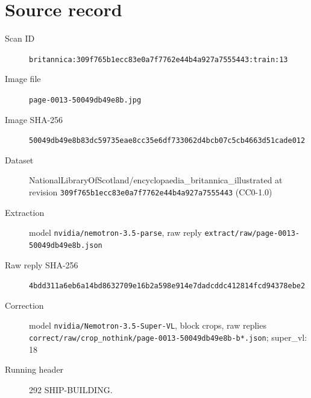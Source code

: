 \documentclass{article}
\begin{document}
\section*{Source record}
\begin{description}
\item[Scan ID] \texttt{britannica:309f765b1ecc83e0a7f7762e44b4a927a7555443:train:13}
\item[Image file] \texttt{page-0013-50049db49e8b.jpg}
\item[Image SHA-256] \texttt{50049db49e8b83dc59735eae8cc35e6df733062d4bcb07c5cb4663d51cade012}
\item[Dataset] NationalLibraryOfScotland/encyclopaedia\_britannica\_illustrated at revision \texttt{309f765b1ecc83e0a7f7762e44b4a927a7555443} (CC0-1.0)
\item[Extraction] model \texttt{nvidia/nemotron-3.5-parse}, raw reply \texttt{extract/raw/page-0013-50049db49e8b.json}
\item[Raw reply SHA-256] \texttt{4bdd311a6eb6a14bd8632709e16b2a598e914e7dadcddc412814fcd94378ebe2}
\item[Correction] model \texttt{nvidia/Nemotron-3.5-Super-VL}, block crops, raw replies \texttt{correct/raw/crop\_nothink/page-0013-50049db49e8b-b*.json}; super\_vl: 18
\item[Running header] 292 SHIP-BUILDING.
\end{description}
\end{document}
